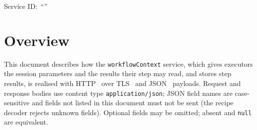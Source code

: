 \documentclass[a4paper]{arrowhead}
\begin{document}
\ArrowheadSetup

\begin{center}
  \vspace*{1cm}
  \huge{\arrowtitle}

  \vspace*{0.2cm}
  \LARGE{\arrowtype}
  \vspace*{1cm}

  \Large{Service ID: \textit{``\arrowid''}}
  \vspace*{\fill}

  

  \vspace*{1cm}
  \vspace*{\fill}

  \begin{abstract}
    This document describes the HTTP/TLS/JSON interface of the \texttt{workflowContext} service of the Eclipse Arrowhead workflow support systems, service version 1.0.0, documentation edition 5.4.0. It realises the abstract operations of the \texttt{workflowContext} SD.
  \end{abstract}

  \vspace*{1cm}
\end{center}

\newpage

\tableofcontents
\newpage

\section{Overview}
\label{sec:overview}
This document describes how the \texttt{workflowContext} service, which gives executors the session parameters and the results their step may read, and stores step results, is realised with HTTP~\cite{rfc9110}
over TLS~\cite{rfc8446} and JSON~\cite{rfc8259} payloads. Request and response bodies use content type
\texttt{application/json}; JSON field names are case-sensitive and fields not listed in this document must not be sent
(the recipe decoder rejects unknown fields). Optional fields may be omitted; absent and \texttt{null} are equivalent.
\end{document}
